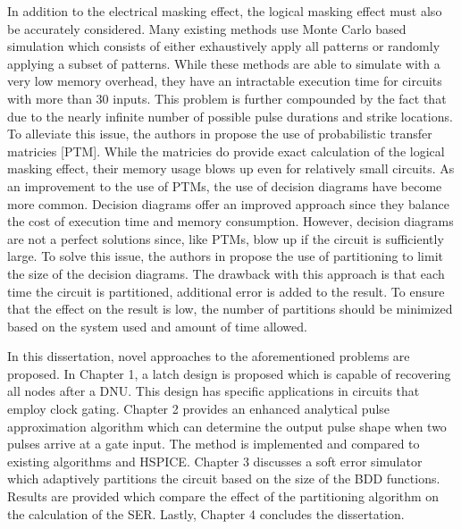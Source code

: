 In addition to the electrical masking effect, the logical masking effect must also be accurately considered. Many existing methods use Monte Carlo based simulation which consists of either exhaustively apply all patterns or randomly applying a subset of patterns. \cite{Accurate_Masking,PARAM_DESC,SEMM,SERA,SETA_LA} While these methods are able to simulate with a very low memory overhead, they have an intractable execution time for circuits with more than 30 inputs. This problem is further compounded by the fact that due to the nearly infinite number of possible pulse durations and strike locations. To alleviate this issue, the authors in \cite{PTM} propose the use of probabilistic transfer matricies [PTM]. While the matricies do provide exact calculation of the logical masking effect, their memory usage blows up even for relatively small circuits. As an improvement to the use of PTMs, the use of decision diagrams have become more common. \cite{FASER,MARS_C} Decision diagrams offer an improved approach since they balance the cost of execution time and memory consumption. However, decision diagrams are not a perfect solutions since, like PTMs, blow up if the circuit is sufficiently large. To solve this issue, the authors in \cite{FASER} propose the use of partitioning to limit the size of the decision diagrams. The drawback with this approach is that each time the circuit is partitioned, additional error is added to the result. To ensure that the effect on the result is low, the number of partitions should be minimized based on the system used and amount of time allowed. 

In this dissertation, novel approaches to the aforementioned problems are proposed. In Chapter 1, a latch design is proposed which is capable of recovering all nodes after a DNU. This design has specific applications in circuits that employ clock gating. Chapter 2 provides an enhanced analytical pulse approximation algorithm which can determine the output pulse shape when two pulses arrive at a gate input. The method is implemented and compared to existing algorithms and HSPICE. Chapter 3 discusses a soft error simulator which adaptively partitions the circuit based on the size of the BDD functions. Results are provided which compare the effect of the partitioning algorithm on the calculation of the SER. Lastly, Chapter 4 concludes the dissertation.
